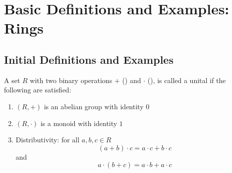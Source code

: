 \chapter{ Basic Definitions and Examples: Rings}
\label{RingDefs}
\section{ Initial Definitions and Examples}



\begin{definition}
    A set $R$ with two binary operations $+$ () and $\cdot$ (), is called a unital  if the following are satisfied:
    \begin{enumerate}
        \item $(R,+)$ is an abelian group with identity $0$
        \item $(R,\cdot)$ is a monoid with identity $1$
        \item Distributivity: for all $a,b,c \in R$ $$(a + b)\cdot c = a\cdot c + b\cdot c$$
        and $$a\cdot (b+c) = a\cdot b + a\cdot c$$
    \end{enumerate}
\end{definition}

